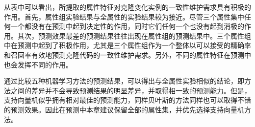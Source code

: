 从表中可以看出，所提取的属性特征对克隆变化实例的一致性维护需求具有积极的作用。首先，属性组实验结果与全属性的实验结果较为接近。尽管三个属性集中任何一个都没有在预测中起到决定性的作用，同时它们任何一个也没有起到消极的作用。其次，预测效果最差的预测结果往往出现在属性组的预测结果中。三个属性组中在预测中起到了积极作用，尤其是三个属性组作为一个整体以可以接受的精确率和召回率有效地预测克隆代码的一致性维护需求。另外，不同的属性特征在预测中也会发挥不同的作用。


通过比较五种机器学习方法的预测结果，可以得出与全属性实验相似的结论，即方法之间的差异并不会导致预测结果的明显差异，并取得相一致的预测能力。但是，支持向量机似乎拥有相对最佳的预测能力，同样贝叶斯的方法同样也可以取得不错的预测效果。因此在预测中本章建议保留全部的属性集，并优先选择支持向量机方法。


